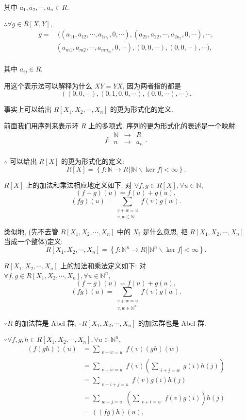 \documentclass[color=black,device=normal,lang=cn,mode=geye]{elegantnote}
\begin{document}
其中 $a_1,a_2,\cdots,a_n\in R$.

$\therefore\forall g\in R[X,Y]$,
\begin{align*}
    g= & \ ((a_{11},a_{12},\cdots,a_{1n_1},0,\cdots),(a_{21},a_{22},\cdots,a_{2n_2},0,\cdots),\cdots, \\
    & (a_{m1},a_{m2},\cdots,a_{mn_m},0,\cdots),(0,0,\cdots),(0,0,\cdots),\cdots), \\
\end{align*}

其中 $a_{ij}\in R$.

用这个表示法可以解释为什么 $XY=YX$, 因为两者指的都是
\[((0,0,\cdots),(0,1,0,0,\cdots),(0,0,\cdots),\cdots).\]

事实上可以给出 $R[X_1,X_2,\cdots,X_n]$ 的更为形式化的定义.

前面我们用序列来表示环 $R$ 上的多项式. 序列的更为形式化的表述是一个映射:
\[f:\begin{array}{rcl}
    \mathbb{N} & \to & R \\
    n & \to & a_n \\
\end{array}.\]

$\therefore$ 可以给出 $R[X]$ 的更为形式化的定义:
\[R[X]=\left\{f:\mathbb{N}\to R\Big||\mathbb{N}\backslash\ker f|<\infty\right\}.\]

$R[X]$ 上的加法和乘法相应地定义如下: 对 $\forall f,g\in R[X],\forall u\in\mathbb{N}$, 
\[(f+g)(u)=f(u)+g(u),\]
\[(fg)(u)=\sum\limits_{\substack{v+w=u\\v,w\in\mathbb{N}}}f(v)g(w).\]

类似地, (先不去管 $R[X_1,X_2,\cdots,X_n]$ 中的 $X_i$ 是什么意思, 把 $R[X_1,X_2,\cdots,X_n]$ 当成一个整体)定义:
\[R[X_1,X_2,\cdots,X_n]=\left\{f:\mathbb{N}^n\to R\Big||\mathbb{N}^n\backslash\ker f|<\infty\right\}.\]

$R[X_1,X_2,\cdots,X_n]$ 上的加法和乘法定义如下: 对 $\forall f,g\in R[X_1,X_2,\cdots,X_n],\forall u\in\mathbb{N}^n$, 
\[(f+g)(u)=f(u)+g(u),\]
\[(fg)(u)=\sum\limits_{\substack{v+w=u\\v,w\in\mathbb{N}^n}}f(v)g(w).\]

$\because R$ 的加法群是 Abel 群, $\therefore R[X_1,X_2,\cdots,X_n]$ 的加法群也是 Abel 群.

$\because\forall f,g,h\in R[X_1,X_2,\cdots,X_n],\forall u\in\mathbb{N}^n$,
\begin{align*}
    (f(gh))(u) & =\sum\limits_{\substack{v+w=u}}f(v)(gh)(w) \\
    & =\sum\limits_{\substack{v+w=u}}f(v)\left(\sum\limits_{\substack{i+j=w}}g(i)h(j)\right) \\
    & =\sum\limits_{\substack{v+i+j=u}}f(v)g(i)h(j) \\
    & =\sum\limits_{\substack{w+j=u}}\left(\sum\limits_{\substack{v+i=w}}f(v)g(i)\right)h(j) \\
    & =((fg)h)(u),
\end{align*}
\end{document}
